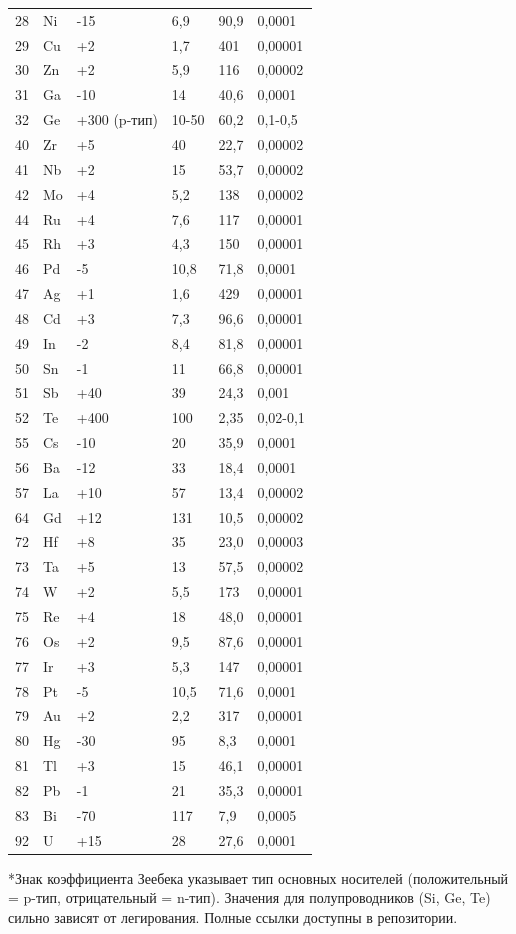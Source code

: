 \documentclass[12pt,a4paper]{article}
\begin{document}
\begin{longtable}{p{0.8cm}p{1.2cm}p{2.2cm}p{2.2cm}p{2.2cm}p{2.2cm}}
		28 & Ni & -15 & 6,9 & 90,9 & 0,0001 \\
		29 & Cu & +2 & 1,7 & 401 & 0,00001 \\
		30 & Zn & +2 & 5,9 & 116 & 0,00002 \\
		31 & Ga & -10 & 14 & 40,6 & 0,0001 \\
		32 & Ge & +300 (p-тип) & 10-50 & 60,2 & 0,1-0,5 \\
		40 & Zr & +5 & 40 & 22,7 & 0,00002 \\
		41 & Nb & +2 & 15 & 53,7 & 0,00002 \\
		42 & Mo & +4 & 5,2 & 138 & 0,00002 \\
		44 & Ru & +4 & 7,6 & 117 & 0,00001 \\
		45 & Rh & +3 & 4,3 & 150 & 0,00001 \\
		46 & Pd & -5 & 10,8 & 71,8 & 0,0001 \\
		47 & Ag & +1 & 1,6 & 429 & 0,00001 \\
		48 & Cd & +3 & 7,3 & 96,6 & 0,00001 \\
		49 & In & -2 & 8,4 & 81,8 & 0,00001 \\
		50 & Sn & -1 & 11 & 66,8 & 0,00001 \\
		51 & Sb & +40 & 39 & 24,3 & 0,001 \\
		52 & Te & +400 & 100 & 2,35 & 0,02-0,1 \\
		55 & Cs & -10 & 20 & 35,9 & 0,0001 \\
		56 & Ba & -12 & 33 & 18,4 & 0,0001 \\
		57 & La & +10 & 57 & 13,4 & 0,00002 \\
		64 & Gd & +12 & 131 & 10,5 & 0,00002 \\
		72 & Hf & +8 & 35 & 23,0 & 0,00003 \\
		73 & Ta & +5 & 13 & 57,5 & 0,00002 \\
		74 & W  & +2 & 5,5 & 173 & 0,00001 \\
		75 & Re & +4 & 18 & 48,0 & 0,00001 \\
		76 & Os & +2 & 9,5 & 87,6 & 0,00001 \\
		77 & Ir & +3 & 5,3 & 147 & 0,00001 \\
		78 & Pt & -5 & 10,5 & 71,6 & 0,0001 \\
		79 & Au & +2 & 2,2 & 317 & 0,00001 \\
		80 & Hg & -30 & 95 & 8,3 & 0,0001 \\
		81 & Tl & +3 & 15 & 46,1 & 0,00001 \\
		82 & Pb & -1 & 21 & 35,3 & 0,00001 \\
		83 & Bi & -70 & 117 & 7,9 & 0,0005 \\
		92 & U  & +15 & 28 & 27,6 & 0,0001 \\
		\bottomrule
	\end{longtable}
	*Знак коэффициента Зеебека указывает тип основных носителей (положительный = p-тип, отрицательный = n-тип). Значения для полупроводников (Si, Ge, Te) сильно зависят от легирования. Полные ссылки доступны в репозитории.
	
\end{document}
